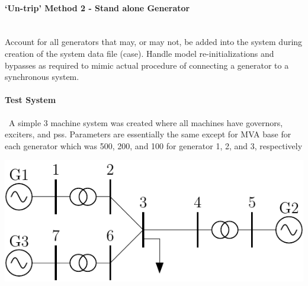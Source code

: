 \documentclass[12pt]{article}
\begin{document}
\paragraph{`Un-trip' Method 2 - Stand alone Generator } \ \\
Account for all generators that may, or may not, be added into the system during creation of the system data file (case).
Handle model re-initializations and bypasses as required to mimic actual procedure of connecting a generator to a synchronous system.

\paragraph{Test System}\ A simple 3 machine system was created where all machines have governors, exciters, and pss.
Parameters are essentially the same except for MVA base for each generator which was 500, 200, and 100 for generator 1, 2, and 3, respectively

\begin{center}
\includegraphics[width=.85\linewidth]{200831-3mach7bus}
\end{center}
\end{document}
